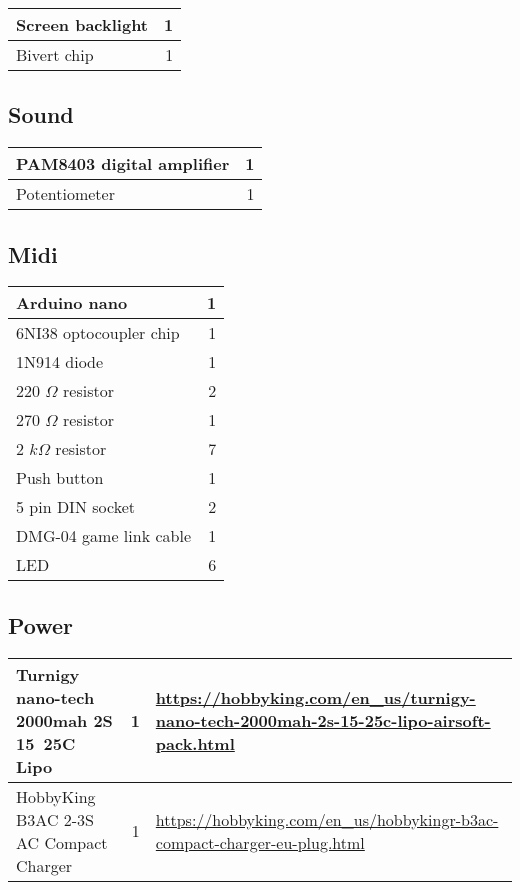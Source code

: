\documentclass{article}
\begin{document}
\begin{tabular}{p{5cm} r}

        \hline Screen backlight & 1 \\
        \hline Bivert chip & 1 \\
        \hline
\end{tabular}

\subsection{Sound}
\begin{tabular}{p{5cm} r}

        \hline PAM8403 digital amplifier & 1 \\
        \hline Potentiometer & 1 \\
        \hline 
        
\end{tabular}

\subsection{Midi}

\begin{tabular}{p{5cm} r}

        \hline Arduino nano & 1 \\
        \hline 6NI38 optocoupler chip & 1 \\
        \hline 1N914 diode & 1 \\
        \hline 220 $\Omega$ resistor & 2 \\
        \hline 270 $\Omega$ resistor & 1 \\
        \hline 2 $k\Omega$ resistor & 7 \\
        \hline Push button & 1 \\
        \hline 5 pin DIN socket & 2 \\
        \hline DMG-04 game link cable & 1 \\
        \hline LED & 6 \\
        \hline

\end{tabular}

\subsection{Power}

\begin{tabular}{p{5cm} r p{8cm}}

        \hline Turnigy nano-tech 2000mah 2S 15~25C Lipo & 1 & \url{https://hobbyking.com/en_us/turnigy-nano-tech-2000mah-2s-15-25c-lipo-airsoft-pack.html} \\
        \hline HobbyKing B3AC 2-3S AC Compact Charger & 1 & \url{https://hobbyking.com/en_us/hobbykingr-b3ac-compact-charger-eu-plug.html} \\
        \hline

\end{tabular}
\end{document}
